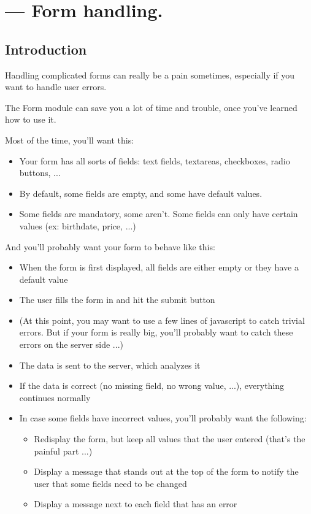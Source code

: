 \section{ --- Form handling.}

\subsection{Introduction}
Handling complicated forms can really be a pain sometimes, especially if you want to handle user errors.

The Form module can save you a lot of time and trouble, once you've learned how to use it.

Most of the time, you'll want this:
\begin{itemize}
\item
Your form has all sorts of fields: text fields, textareas, checkboxes, radio buttons, ...
\item
By default, some fields are empty, and some have default values.
\item
Some fields are mandatory, some aren't. Some fields can only have certain values (ex: birthdate, price, ...)
\end{itemize}

And you'll probably want your form to behave like this:
\begin{itemize}
\item
When the form is first displayed, all fields are either empty or they have a default value
\item
The user fills the form in and hit the submit button
\item
(At this point, you may want to use a few lines of javascript to catch trivial errors. But if your
form is really big, you'll probably want to catch these errors on the server side ...)
\item
The data is sent to the server, which analyzes it
\item
If the data is correct (no missing field, no wrong value, ...), everything continues normally
\item
In case some fields have incorrect values, you'll probably want the following:
\begin{itemize}
\item
Redisplay the form, but keep all values that the user entered (that's the painful part ...)
\item
Display a message that stands out at the top of the form to notify the user that some fields need to be changed
\item
Display a message next to each field that has an error
\end{itemize}
\end{itemize}

